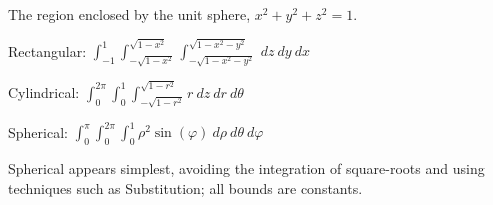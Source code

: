 {The region enclosed by the unit sphere, $x^2+y^2+z^2=1$.
}
{Rectangular: $\int_{-1}^{1}\int_{-\sqrt{1-x^2}}^{\sqrt{1-x^2}}\int_{-\sqrt{1-x^2-y^2}}^{\sqrt{1-x^2-y^2}}\ dz\ dy\ dx$

Cylindrical: $\int_0^{2\pi}\int_0^1\int_{-\sqrt{1-r^2}}^{\sqrt{1-r^2}}r\ dz\ dr\ d\theta$

Spherical: $\int_0^\pi\int_0^{2\pi}\int_0^1 \rho^2\sin(\varphi)\ d\rho\ d\theta\ d\varphi$

Spherical appears simplest, avoiding the integration of square-roots and using techniques such as Substitution; all bounds are constants.
}
